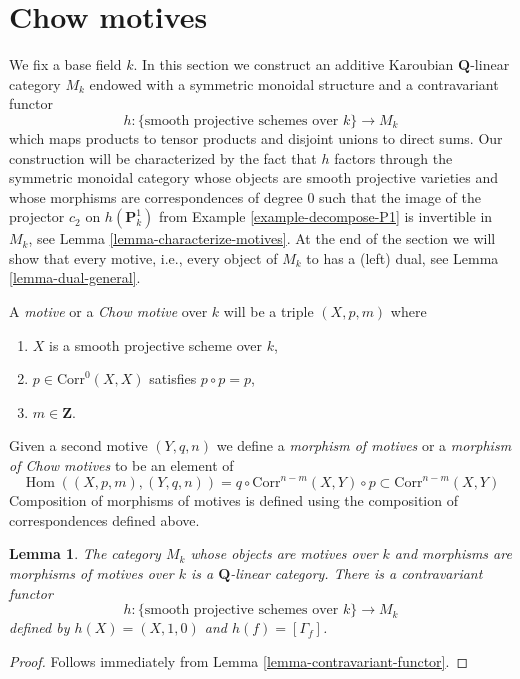 \documentclass{stacks-project}
\theoremstyle{plain}
\newtheorem{lemma}[subsection]{Lemma}
\theoremstyle{definition}
\theoremstyle{remark}
\numberwithin{equation}{subsection}
\def\Hom{\mathop{\mathrm{Hom}}\nolimits}
\begin{document}
\section{Chow motives}
\label{section-chow-motives}

\noindent
We fix a base field $k$. In this section we construct an additive
Karoubian $\mathbf{Q}$-linear category $M_k$ endowed
with a symmetric monoidal structure and a contravariant functor
$$
h : \{\text{smooth projective schemes over }k\} \longrightarrow M_k
$$
which maps products to tensor products and disjoint unions to direct sums.
Our construction will be characterized by the fact that $h$ factors through
the symmetric monoidal category whose objects are smooth projective varieties
and whose morphisms are correspondences of degree $0$ such that
the image of the projector $c_2$ on $h(\mathbf{P}^1_k)$ from
Example \ref{example-decompose-P1} is invertible in $M_k$, see
Lemma \ref{lemma-characterize-motives}.
At the end of the section we will show that every motive, i.e.,
every object of $M_k$ to has a (left) dual, see Lemma \ref{lemma-dual-general}.

\medskip\noindent
A {\it motive} or a {\it Chow motive} over $k$ will be a triple
$(X, p, m)$ where
\begin{enumerate}
\item $X$ is a smooth projective scheme over $k$,
\item $p \in \text{Corr}^0(X, X)$ satisfies $p \circ p = p$,
\item $m \in \mathbf{Z}$.
\end{enumerate}
Given a second motive $(Y, q, n)$ we define a
{\it morphism of motives} or a {\it morphism of Chow motives}
to be an element of
$$
\Hom((X, p, m), (Y, q, n)) =
q \circ \text{Corr}^{n - m}(X, Y) \circ p \subset \text{Corr}^{n - m}(X, Y)
$$
Composition of morphisms of motives is defined using the composition of
correspondences defined above.

\begin{lemma}
\label{lemma-motives}
The category $M_k$ whose objects are motives over $k$ and morphisms
are morphisms of motives over $k$ is a $\mathbf{Q}$-linear category.
There is a contravariant functor
$$
h : \{\text{smooth projective schemes over }k\} \longrightarrow M_k
$$
defined by $h(X) = (X, 1, 0)$ and $h(f) = [\Gamma_f]$.
\end{lemma}

\begin{proof}
Follows immediately from Lemma \ref{lemma-contravariant-functor}.
\end{proof}
\end{document}
